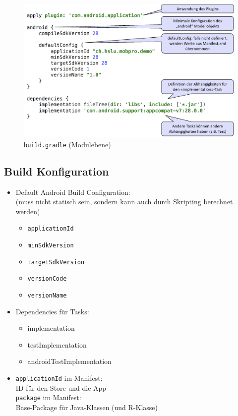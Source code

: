 \documentclass[a4paper]{article}
\begin{document}
{	\begin{figure}[!htb]
		\centering
		\includegraphics[width=.9\textwidth]{img/flashtalk1/gradle_module.png}
		\caption{\texttt{build.gradle} (Modulebene)}
		\label{fig:gradle_module}
	\end{figure}

	\newpage
	
	\subsection{Build Konfiguration}
	
	\begin{itemize}
		
		\item Default Android Build Configuration:\\
				(muss nicht statisch sein, sondern kann auch durch Skripting berechnet werden)
		\begin{itemize}
			\item \texttt{applicationId}
			\item \texttt{minSdkVersion}
			\item \texttt{targetSdkVersion}
			\item \texttt{versionCode}
			\item \texttt{versionName}
		\end{itemize}
				
		\item Dependencies für Tasks:
		\begin{itemize}
			\item implementation
			\item testImplementation
			\item androidTestImplementation
		\end{itemize}
	
		\item \texttt{applicationId} im Manifest:\\
				ID für den Store und die App\\
				\texttt{package} im Manifest:\\
				Base-Package für Java-Klassen (und R-Klasse)
		

\end{itemize}}
\end{document}
